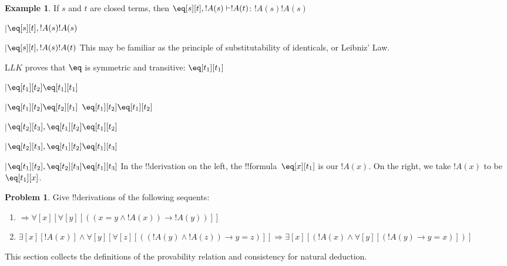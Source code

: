\documentclass[10pt,a4paper]{article}
\theoremstyle{plain}
\theoremstyle{definition}
\newtheorem{ex}[thm]{Example}
\newtheorem{prob}{Problem}[section]
\theoremstyle{remark}
\newenvironment{editorial}{}{}
\providecommand{\RightLabel}[1]{}
\providecommand{\DisplayProof}{}
\providecommand{\fCenter}{}
\newenvironment{prooftree}{}{}
\providecommand{\lif}{\mathbin{\rightarrow}}
\providecommand{\lforall}{\mathord{\forall}}
\providecommand{\lexists}{\mathord{\exists}}
\providecommand{\Sequent}{\mathrel{\Rightarrow}}
\providecommand{\Proves}{\mathrel{\vdash}}
\providecommand{\Log}{\ensuremath{\mathrm{L}}}
\providecommand{\LeftR}[1]{}
\providecommand{\UnaryInf}{\ensuremath{\mid}}
\providecommand{\Weakening}{\mathrm{Wk}}
\providecommand{\LeftR}{\mathrm{L}}
\providecommand{\Axiom}{\mathrm{Ax}}
\providecommand{\bottomAlignProof}{\relax}
\providecommand{\bottomAlignProof}{\relax}
\begin{document}
\begin{ex}
If $s$ and $t$ are closed terms, then $\eq[s][t], !A(s)
\Proves !A(t)$:
\begin{prooftree}
\Axiom$ !A(s) \fCenter !A(s)$
\RightLabel{\LeftR{\Weakening}}
\UnaryInf$\eq[s][t], !A(s)  \fCenter !A(s)$
\RightLabel{$\eq$}
\UnaryInf$\eq[s][t], !A(s)  \fCenter !A(t)$
\end{prooftree}
This may be familiar as the principle of substitutability of
identicals, or Leibniz' Law.

$\Log{LK}$ proves that $\eq$ is symmetric and transitive:
\begin{prooftree}
\Axiom$ \fCenter \eq[t_1][t_1] $
\RightLabel{\LeftR{\Weakening}}
\UnaryInf$ \eq[t_1][t_2] \fCenter \eq[t_1][t_1] $
\RightLabel{$\eq$}
\UnaryInf$ \eq[t_1][t_2] \fCenter \eq[t_2][t_1]$
\DisplayProof\qquad\bottomAlignProof
\Axiom$ \eq[t_1][t_2] \fCenter \eq[t_1][t_2] $
\RightLabel{\LeftR{\Weakening}}
\UnaryInf$\eq[t_2][t_3], \eq[t_1][t_2]  \fCenter \eq[t_1][t_2] $
\RightLabel{$\eq$}
\UnaryInf$\eq[t_2][t_3], \eq[t_1][t_2]  \fCenter \eq[t_1][t_3]$
\RightLabel{\LeftR{\Exchange}}
\UnaryInf$\eq[t_1][t_2], \eq[t_2][t_3]  \fCenter \eq[t_1][t_3]$
\end{prooftree}
In the !!{derivation} on the left, the !!{formula}~$\eq[x][t_1]$ is our
$!A(x)$. On the right, we take $!A(x)$ to be~$\eq[t_1][x]$.
\end{ex}

\begin{prob}
Give !!{derivation}s of the following sequents:
\begin{enumerate}
\item $\Sequent \lforall[x][\lforall[y][((x = y \land !A(x)) \lif !A(y))]]$
\item $\lexists[x][!A(x)] \land \lforall[y][\lforall[z][((!A(y) \land
    !A(z)) \lif y = z)]] \Sequent 
\lexists[x][(!A(x) \land \lforall[y][(!A(y) \lif y = x)])]$
\end{enumerate}
\end{prob}





\begin{editorial}
  This section collects the definitions of the provability relation and
  consistency for natural deduction.
\end{editorial}
\end{document}
